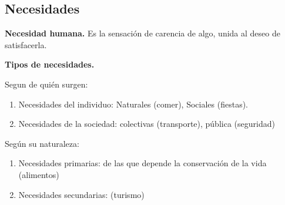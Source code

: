 \subsection{Necesidades}

\textbf{Necesidad humana.}
Es la sensación de carencia de algo,
unida al deseo de satisfacerla.

\textbf{Tipos de necesidades.}

Segun de quién surgen:

\begin{enumerate}
    \item Necesidades del individuo: Naturales (comer), Sociales (fiestas).
    \item Necesidades de la sociedad: colectivas (transporte), pública (seguridad)
\end{enumerate}

Según su naturaleza:

\begin{enumerate}
    \item Necesidades primarias: de las que depende la conservación de la vida (alimentos)
    \item Necesidades secundarias: (turismo)
\end{enumerate}